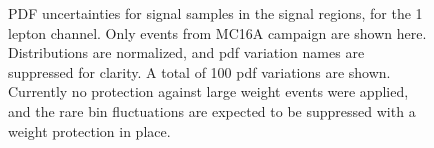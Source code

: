 \begin{figure}[ht]
    \centering
        \caption{PDF uncertainties for 
signal samples in the signal regions, for the 1 lepton channel. Only events from MC16A campaign are shown here. Distributions are normalized, and pdf variation names are suppressed for clarity. 
A total of 100 pdf variations are shown. Currently no protection against large weight events were applied, and the rare bin fluctuations are expected to be suppressed with a weight protection in place.}
    \label{fig:PDFUnc1Lep_sig}
\end{figure}

